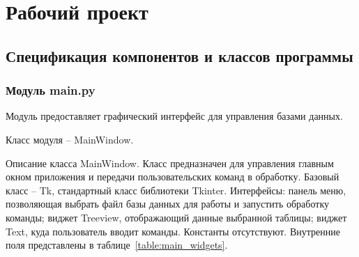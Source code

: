 \section{Рабочий проект}

\subsection{Спецификация компонентов и классов программы}

\subsubsection{Модуль main.py}

Модуль предоставляет графический интерфейс для управления базами данных. 

Класс модуля -- MainWindow.

Описание класса MainWindow.
Класс предназначен для управления главным окном приложения и передачи пользовательских команд в обработку. Базовый класс -- Tk, стандартный класс библиотеки Tkinter. Интерфейсы: панель меню, позволяющая выбрать файл базы данных для работы и запустить обработку команды; виджет Treeview, отображающий данные выбранной таблицы; виджет Text, куда пользователь вводит команды. Константы отсутствуют. Внутренние поля представлены в таблице~\ref{table:main_widgets}.

